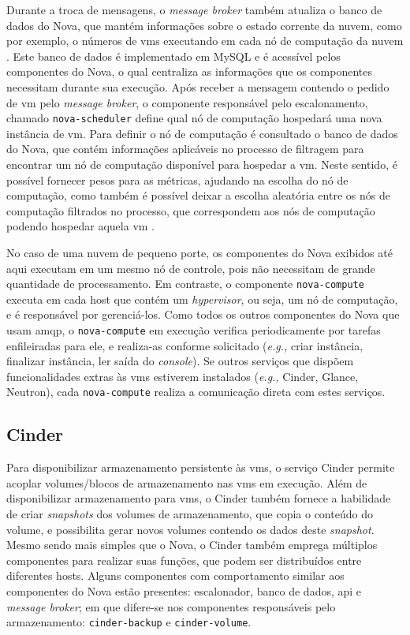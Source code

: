 Durante a troca de mensagens, o \textit{message broker} também atualiza o banco de dados do Nova, que mantém informações sobre o estado corrente da nuvem, como por exemplo, o números de \acp{vm} executando em cada nó de computação da nuvem \cite{redhat:components}.
%
Este banco de dados é implementado em MySQL e é acessível pelos componentes do Nova, o qual centraliza as informações que os componentes necessitam durante sua execução.
%
Após receber a mensagem contendo o pedido de \ac{vm} pelo \textit{message broker}, o componente responsável pelo escalonamento, chamado \texttt{nova-scheduler} define qual nó de computação hospedará uma nova instância de \ac{vm}.
%
Para definir o nó de computação é consultado o banco de dados do Nova, que contém informações aplicáveis no processo de filtragem para encontrar um nó de computação disponível para hospedar a \ac{vm}.
%
Neste sentido, é possível fornecer pesos para as métricas, ajudando na escolha do nó de computação, como também é possível deixar a escolha aleatória entre os nós de computação filtrados no processo, que correspondem aos nós de computação podendo hospedar aquela \ac{vm} \cite{openstack:nova}.

No caso de uma nuvem de pequeno porte, os componentes do Nova exibidos até aqui executam em um mesmo nó de controle, pois não necessitam de grande quantidade de processamento.
%
Em contraste, o componente \texttt{nova-compute} executa em cada host que contém um \textit{hypervisor}, ou seja, um nó de computação, e é responsável por gerenciá-los.
%
Como todos os outros componentes do Nova que usam \ac{amqp}, o \texttt{nova-compute} em execução verifica periodicamente por tarefas enfileiradas para ele, e realiza-as conforme solicitado (\textit{e.g.,} criar instância, finalizar instância, ler saída do \textit{console}).
%
Se outros serviços que dispõem funcionalidades extras às \acp{vm} estiverem instalados (\textit{e.g.,} Cinder, Glance, Neutron), cada \texttt{nova-compute} realiza a comunicação direta com estes serviços.


\subsection{Cinder}

Para disponibilizar armazenamento persistente às \acp{vm}, o serviço Cinder permite acoplar volumes/blocos de armazenamento nas \acp{vm} em execução.
%
Além de disponibilizar armazenamento para \acp{vm}, o Cinder também fornece a habilidade de criar \textit{snapshots} dos volumes de armazenamento, que copia o conteúdo do volume, e possibilita gerar novos volumes contendo os dados deste \textit{snapshot}.
%
Mesmo sendo mais simples que o Nova, o Cinder também emprega múltiplos componentes para realizar suas funções, que podem ser distribuídos entre diferentes hosts.
%
Alguns componentes com comportamento similar aos componentes do Nova estão presentes: escalonador, banco de dados, \ac{api} e \textit{message broker}; em que difere-se nos componentes responsáveis pelo armazenamento: \texttt{cinder-backup} e \texttt{cinder-volume}.

